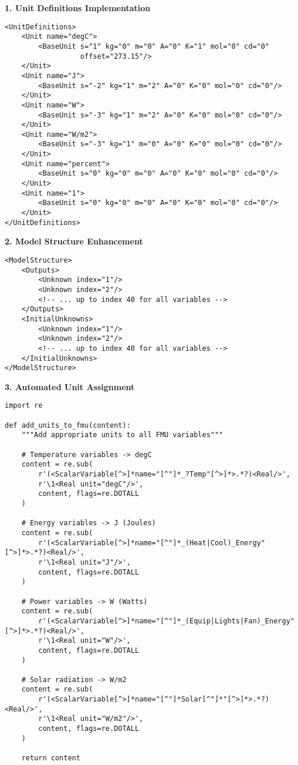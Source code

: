 \documentclass[12pt,a4paper]{article}
\begin{document}
\textbf{1. Unit Definitions Implementation}
\begin{lstlisting}[style=xml, caption=Complete UnitDefinitions Section]
<UnitDefinitions>
    <Unit name="degC">
        <BaseUnit s="1" kg="0" m="0" A="0" K="1" mol="0" cd="0" 
                  offset="273.15"/>
    </Unit>
    <Unit name="J">
        <BaseUnit s="-2" kg="1" m="2" A="0" K="0" mol="0" cd="0"/>
    </Unit>
    <Unit name="W">
        <BaseUnit s="-3" kg="1" m="2" A="0" K="0" mol="0" cd="0"/>
    </Unit>
    <Unit name="W/m2">
        <BaseUnit s="-3" kg="1" m="0" A="0" K="0" mol="0" cd="0"/>
    </Unit>
    <Unit name="percent">
        <BaseUnit s="0" kg="0" m="0" A="0" K="0" mol="0" cd="0"/>
    </Unit>
    <Unit name="1">
        <BaseUnit s="0" kg="0" m="0" A="0" K="0" mol="0" cd="0"/>
    </Unit>
</UnitDefinitions>
\end{lstlisting}

\textbf{2. Model Structure Enhancement}
\begin{lstlisting}[style=xml, caption=ModelStructure Section Implementation]
<ModelStructure>
    <Outputs>
        <Unknown index="1"/>
        <Unknown index="2"/>
        <!-- ... up to index 40 for all variables -->
    </Outputs>
    <InitialUnknowns>
        <Unknown index="1"/>
        <Unknown index="2"/>
        <!-- ... up to index 40 for all variables -->
    </InitialUnknowns>
</ModelStructure>
\end{lstlisting}

\textbf{3. Automated Unit Assignment}
\begin{lstlisting}[style=python, caption=Python Script for Unit Assignment]
import re

def add_units_to_fmu(content):
    """Add appropriate units to all FMU variables"""
    
    # Temperature variables -> degC
    content = re.sub(
        r'(<ScalarVariable[^>]*name="[^"]*_?Temp"[^>]*>.*?)<Real/>',
        r'\1<Real unit="degC"/>', 
        content, flags=re.DOTALL
    )
    
    # Energy variables -> J (Joules)
    content = re.sub(
        r'(<ScalarVariable[^>]*name="[^"]*_(Heat|Cool)_Energy"[^>]*>.*?)<Real/>',
        r'\1<Real unit="J"/>', 
        content, flags=re.DOTALL
    )
    
    # Power variables -> W (Watts)
    content = re.sub(
        r'(<ScalarVariable[^>]*name="[^"]*_(Equip|Lights|Fan)_Energy"[^>]*>.*?)<Real/>',
        r'\1<Real unit="W"/>', 
        content, flags=re.DOTALL
    )
    
    # Solar radiation -> W/m2
    content = re.sub(
        r'(<ScalarVariable[^>]*name="[^"]*Solar[^"]*"[^>]*>.*?)<Real/>',
        r'\1<Real unit="W/m2"/>', 
        content, flags=re.DOTALL
    )
    
    return content
\end{lstlisting}
\end{document}
